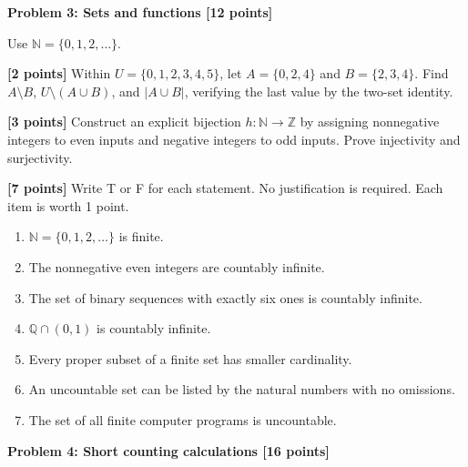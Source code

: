 \documentclass[12pt,letterpaper]{article}
\newcommand{\problemheading}[2][5\baselineskip]{\Needspace{#1}\par\noindent\hspace*{-0.625in}\textbf{#2}\par\nobreak\vspace{0.3em}}
\newcommand{\examspace}[1]{\par\vspace*{#1cm}}
\begin{document}
\clearpage
\vspace*{0.21in}
\problemheading{Problem 3: Sets and functions [12 points]}
\begin{list}{}{\setlength{\leftmargin}{0.25in}\setlength{\rightmargin}{0.25in}}\item[]
Use $\mathbb N=\{0,1,2,\ldots\}$.
\begin{description}[font=\normalfont,leftmargin=1.2em,labelsep=0.4em]
\item[(a)] \textbf{[2 points]} Within $U=\{0,1,2,3,4,5\}$, let $A=\{0,2,4\}$ and $B=\{2,3,4\}$. Find $A\setminus B$, $U\setminus(A\cup B)$, and $|A\cup B|$, verifying the last value by the two-set identity.
\examspace{3}
\Needspace{\dimexpr 5cm+4\baselineskip\relax}
\item[(b)] \textbf{[3 points]} Construct an explicit bijection $h:\mathbb N\to\mathbb Z$ by assigning nonnegative integers to even inputs and negative integers to odd inputs. Prove injectivity and surjectivity.
\examspace{5}
\Needspace{\dimexpr 1cm+4\baselineskip\relax}
\item[(c)] \textbf{[7 points]} Write T or F for each statement. No justification is required. Each item is worth 1 point.\begin{enumerate}[label=(\roman*)]\item $\mathbb N=\{0,1,2,\ldots\}$ is finite.\item The nonnegative even integers are countably infinite.\item The set of binary sequences with exactly six ones is countably infinite.\item $\mathbb Q\cap(0,1)$ is countably infinite.\item Every proper subset of a finite set has smaller cardinality.\item An uncountable set can be listed by the natural numbers with no omissions.\item The set of all finite computer programs is uncountable.\end{enumerate}
\examspace{1}
\end{description}
\end{list}
\clearpage
\vspace*{0.21in}
\problemheading{Problem 4: Short counting calculations [16 points]}
\end{document}
